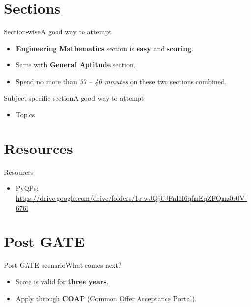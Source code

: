 \documentclass[handout]{beamer}
\begin{document}
\section{Sections}
\begin{frame}{Section-wise}{A good way to attempt}
    \begin{itemize}
        \item \textbf{Engineering Mathematics} section is \textbf{easy} and \textbf{scoring}.
        \item Same with \textbf{General Aptitude} section.
        \item Spend no more than \emph{30 -- 40 minutes} on these two sections combined.
    \end{itemize}
\end{frame}

\begin{frame}{Subject-specific section}{A good way to attempt}
    \begin{itemize}
        \item Topics
    \end{itemize}
\end{frame}

\section{Resources}
\begin{frame}{Resources}
    \begin{itemize}
        \item PyQPs: \\
              \scriptsize{\url{https://drive.google.com/drive/folders/1o-wJQjUJFnIH6qfmEqZFQmz0r0V-676l}}
    \end{itemize}
\end{frame}

\section{Post GATE}
\begin{frame}{Post GATE scenario}{What comes next?}
    \begin{itemize}
        \item Score is valid for \textbf{three years}.
        \item Apply through \textbf{COAP} (Common Offer Acceptance Portal).
    \end{itemize}
\end{frame}
\end{document}
